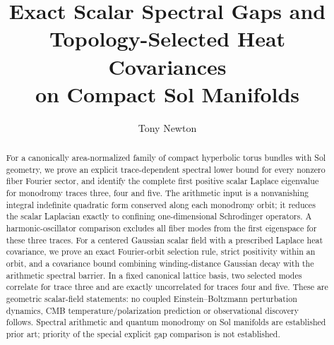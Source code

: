 \documentclass[11pt,a4paper]{article}
\title{\textbf{Exact Scalar Spectral Gaps and Topology-Selected Heat Covariances}\\on Compact Sol Manifolds}
\author{Tony Newton}
\date{}
\begin{document}
\maketitle
\begin{abstract}
For a canonically area-normalized family of compact hyperbolic torus bundles with Sol geometry, we prove an explicit trace-dependent spectral lower bound for every nonzero fiber Fourier sector, and identify the complete first positive scalar Laplace eigenvalue for monodromy traces three, four and five. The arithmetic input is a nonvanishing integral indefinite quadratic form conserved along each monodromy orbit; it reduces the scalar Laplacian exactly to confining one-dimensional Schrodinger operators. A harmonic-oscillator comparison excludes all fiber modes from the first eigenspace for these three traces. For a centered Gaussian scalar field with a prescribed Laplace heat covariance, we prove an exact Fourier-orbit selection rule, strict positivity within an orbit, and a covariance bound combining winding-distance Gaussian decay with the arithmetic spectral barrier. In a fixed canonical lattice basis, two selected modes correlate for trace three and are exactly uncorrelated for traces four and five. These are geometric scalar-field statements: no coupled Einstein--Boltzmann perturbation dynamics, CMB temperature/polarization prediction or observational discovery follows. Spectral arithmetic and quantum monodromy on Sol manifolds are established prior art; priority of the special explicit gap comparison is not established.
\end{abstract}
\end{document}
